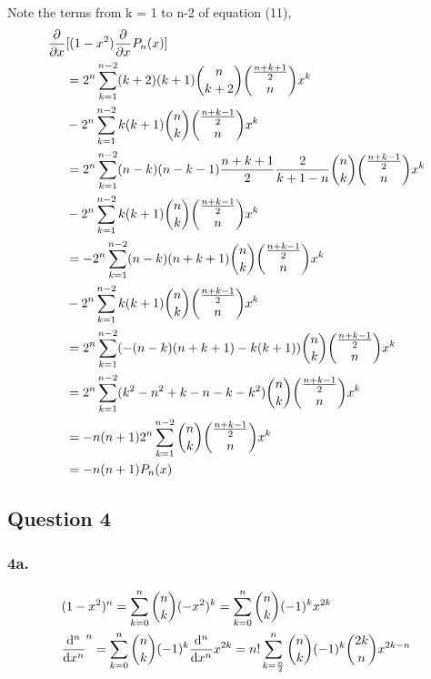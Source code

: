 \documentclass{article}
\begin{document}
Note the terms from k = 1 to n-2 of equation (11),
\begin{equation}
  \begin{split}
    \pdv{}{x} & [(1-x^2)\pdv{}{x}  P_n (x) ] \\
    &= 2^n \sum_{k=1}^{n-2} (k+2) (k+1)\binom{n}{k+2} \binom{\frac{n+k+1}{2}}{n} x^{k}\\
    &-2^n \sum_{k=1}^{n-2} k (k+1) \binom{n}{k} \binom{\frac{n+k-1}{2}}{n} x^{k}\\
    &= 2^n \sum_{k=1}^{n-2} (n-k)(n-k-1) \frac{n+k+1}{2} \frac{2}{k+1-n} \binom{n}{k} \binom{\frac{n+k-1}{2}}{n} x^{k}\\
    &-2^n \sum_{k=1}^{n-2} k (k+1) \binom{n}{k} \binom{\frac{n+k-1}{2}}{n} x^{k}\\
    &= - 2^n \sum_{k=1}^{n-2}(n-k)(n+k+1) \binom{n}{k} \binom{\frac{n+k-1}{2}}{n} x^{k}\\
    &-2^n \sum_{k=1}^{n-2} k (k+1) \binom{n}{k} \binom{\frac{n+k-1}{2}}{n} x^{k}\\
    &= 2^n \sum_{k=1}^{n-2} (-(n-k)(n+k+1) -  k (k+1))\binom{n}{k} \binom{\frac{n+k-1}{2}}{n} x^{k}\\
    &= 2^n \sum_{k=1}^{n-2} (k^2- n^2 + k-n -  k - k^2)\binom{n}{k} \binom{\frac{n+k-1}{2}}{n} x^{k}\\
    &= - n( n +1)2^n \sum_{k=1}^{n-2} \binom{n}{k} \binom{\frac{n+k-1}{2}}{n} x^{k}\\
    &= - n( n +1)P_n (x)\\
  \end{split}
\end{equation}

\subsection*{ Question 4}
\subsubsection*{ 4a.}
\begin{equation}
  \begin{split}
    &(1-x^2)^n = \sum_{k=0}^{n}\binom{n}{k} (-x^2)^k = \sum_{k=0}^{n}\binom{n}{k} (-1)^k x^{2k} \\
    &\dv[n]{}{x} (1-x^2)^n = \sum_{k=0}^{n}\binom{n}{k}(-1)^k \dv[n]{}{x} x^{2k} = n! \sum_{k=\frac{n}{2}}^{n}\binom{n}{k} (-1)^k \binom{2k}{n} x^{2k-n}\\
  \end{split}
\end{equation}
\end{document}
